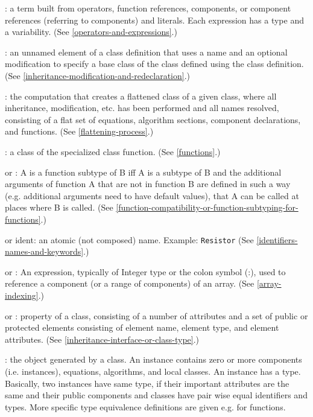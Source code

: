 : a term built from operators, function references,
components, or component references (referring to components) and
literals. Each expression has a type and a variability. (See \autoref{operators-and-expressions}.)

: an unnamed element of a class definition that
uses a name and an optional modification to specify a base class of the
class defined using the class definition. (See \autoref{inheritance-modification-and-redeclaration}.)

: the computation that creates a flattened class of a
given class, where all inheritance, modification, etc. has been
performed and all names resolved, consisting of a flat set of equations,
algorithm sections, component declarations, and functions. (See \autoref{flattening-process}.)

: a class of the specialized class function. (See \autoref{functions}.)

 or : A
is a function subtype of B iff A is a subtype of B and the additional
arguments of function A that are not in function B are defined in such a
way (e.g. additional arguments need to have default values), that A can
be called at places where B is called. (See \autoref{function-compatibility-or-function-subtyping-for-functions}.)

 or ident: an atomic (not composed) name. Example:
\lstinline!Resistor! (See \autoref{identifiers-names-and-keywords}.)

 or : An expression, typically of
Integer type or the colon symbol (:), used to reference a component (or
a range of components) of an array. (See \autoref{array-indexing}.)

 or : property of a
class, consisting of a number of attributes and a set of public or
protected elements consisting of element name, element type, and element
attributes. (See \autoref{inheritance-interface-or-class-type}.)

: the object generated by a class. An instance contains
zero or more components (i.e. instances), equations, algorithms, and
local classes. An instance has a type. Basically, two instances have
same type, if their important attributes are the same and their public
components and classes have pair wise equal identifiers and types. More
specific type equivalence definitions are given e.g. for functions.

